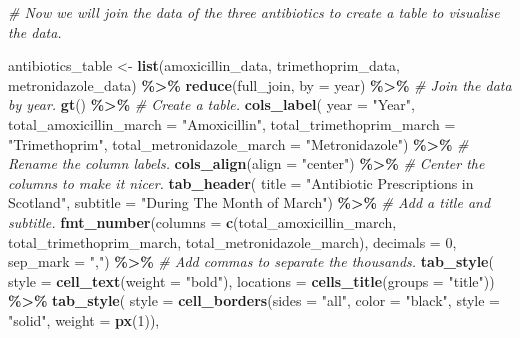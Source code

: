 \documentclass[
]{article}
\newenvironment{Shaded}{\begin{snugshade}}{\end{snugshade}}
\newcommand{\AttributeTok}[1]{\textcolor[rgb]{0.13,0.29,0.53}{#1}}
\newcommand{\CommentTok}[1]{\textcolor[rgb]{0.56,0.35,0.01}{\textit{#1}}}
\newcommand{\DecValTok}[1]{\textcolor[rgb]{0.00,0.00,0.81}{#1}}
\newcommand{\FunctionTok}[1]{\textcolor[rgb]{0.13,0.29,0.53}{\textbf{#1}}}
\newcommand{\NormalTok}[1]{#1}
\newcommand{\OtherTok}[1]{\textcolor[rgb]{0.56,0.35,0.01}{#1}}
\newcommand{\SpecialCharTok}[1]{\textcolor[rgb]{0.81,0.36,0.00}{\textbf{#1}}}
\newcommand{\StringTok}[1]{\textcolor[rgb]{0.31,0.60,0.02}{#1}}
\begin{document}
\begin{Shaded}
\begin{Highlighting}[]
\CommentTok{\# Now we will join the data of the three antibiotics to create a table to visualise the data.}

\NormalTok{antibiotics\_table }\OtherTok{\textless{}{-}} \FunctionTok{list}\NormalTok{(amoxicillin\_data, trimethoprim\_data, metronidazole\_data) }\SpecialCharTok{\%\textgreater{}\%} 
  \FunctionTok{reduce}\NormalTok{(full\_join, }\AttributeTok{by =} \StringTok{\textquotesingle{}year\textquotesingle{}}\NormalTok{) }\SpecialCharTok{\%\textgreater{}\%} \CommentTok{\# Join the data by year.}
  \FunctionTok{gt}\NormalTok{() }\SpecialCharTok{\%\textgreater{}\%} \CommentTok{\# Create a table.}
  \FunctionTok{cols\_label}\NormalTok{(}
    \AttributeTok{year =} \StringTok{"Year"}\NormalTok{, }
    \AttributeTok{total\_amoxicillin\_march =} \StringTok{"Amoxicillin"}\NormalTok{,}
    \AttributeTok{total\_trimethoprim\_march =} \StringTok{"Trimethoprim"}\NormalTok{,}
    \AttributeTok{total\_metronidazole\_march =} \StringTok{"Metronidazole"}\NormalTok{) }\SpecialCharTok{\%\textgreater{}\%} \CommentTok{\# Rename the column labels.}
  \FunctionTok{cols\_align}\NormalTok{(}\AttributeTok{align =} \StringTok{"center"}\NormalTok{) }\SpecialCharTok{\%\textgreater{}\%} \CommentTok{\# Center the columns to make it nicer.}
  \FunctionTok{tab\_header}\NormalTok{(}
    \AttributeTok{title =} \StringTok{"Antibiotic Prescriptions in Scotland"}\NormalTok{,}
    \AttributeTok{subtitle =} \StringTok{"During The Month of March"}\NormalTok{) }\SpecialCharTok{\%\textgreater{}\%} \CommentTok{\# Add a title and subtitle.}
  \FunctionTok{fmt\_number}\NormalTok{(}\AttributeTok{columns =} \FunctionTok{c}\NormalTok{(total\_amoxicillin\_march, }
\NormalTok{                         total\_trimethoprim\_march, }
\NormalTok{                         total\_metronidazole\_march),}
             \AttributeTok{decimals =} \DecValTok{0}\NormalTok{, }\AttributeTok{sep\_mark =} \StringTok{","}\NormalTok{) }\SpecialCharTok{\%\textgreater{}\%} \CommentTok{\# Add commas to separate the thousands.}
  \FunctionTok{tab\_style}\NormalTok{(}
    \AttributeTok{style =} \FunctionTok{cell\_text}\NormalTok{(}\AttributeTok{weight =} \StringTok{"bold"}\NormalTok{),}
    \AttributeTok{locations =} \FunctionTok{cells\_title}\NormalTok{(}\AttributeTok{groups =} \StringTok{"title"}\NormalTok{)) }\SpecialCharTok{\%\textgreater{}\%}
  \FunctionTok{tab\_style}\NormalTok{(}
    \AttributeTok{style =} \FunctionTok{cell\_borders}\NormalTok{(}\AttributeTok{sides =} \StringTok{"all"}\NormalTok{, }\AttributeTok{color =} \StringTok{"black"}\NormalTok{, }\AttributeTok{style =} \StringTok{"solid"}\NormalTok{, }\AttributeTok{weight =} \FunctionTok{px}\NormalTok{(}\DecValTok{1}\NormalTok{)),}

\end{Highlighting}
\end{Shaded}
\end{document}
